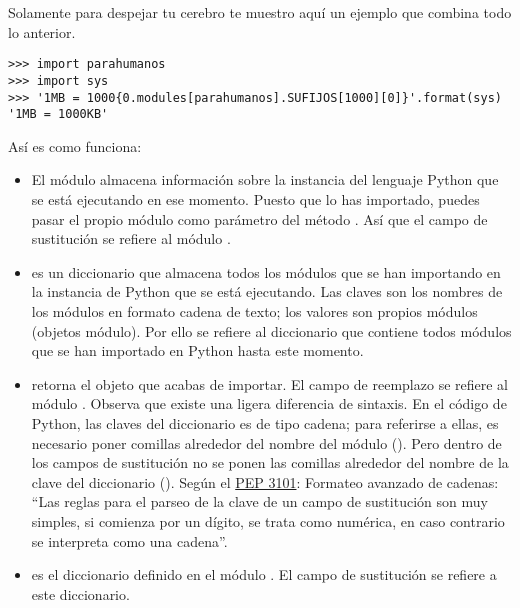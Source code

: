 Solamente para despejar tu cerebro te muestro aquí un ejemplo que combina todo lo anterior.

\noindent\begin{minipage}{\textwidth}
\begin{lstlisting}[mathescape=True]
>>> import parahumanos
>>> import sys
>>> '1MB = 1000{0.modules[parahumanos].SUFIJOS[1000][0]}'.format(sys)
'1MB = 1000KB'
\end{lstlisting}
\end{minipage}

Así es como funciona:

\begin{itemize}

\item El módulo  almacena información sobre la instancia del lenguaje Python que se está ejecutando en ese momento. Puesto que lo has importado, puedes pasar el propio módulo  como parámetro del método . Así que el campo de sustitución  se refiere al módulo .

\item {} es un diccionario que almacena todos los módulos que se han importando en la instancia de Python que se está ejecutando. Las claves son los nombres de los módulos en formato cadena de texto; los valores son propios módulos (objetos módulo). Por ello  se refiere al diccionario que contiene todos módulos que se han importado en Python hasta este momento.

\item {} retorna el objeto  que acabas de importar. El campo de reemplazo  se refiere al módulo . Observa que existe una ligera diferencia de sintaxis. En el código de Python, las claves del diccionario es de tipo cadena; para referirse a ellas, es necesario poner comillas alrededor del nombre del módulo (). Pero dentro de los campos de sustitución no se ponen las comillas alrededor del nombre de la clave del diccionario (). Según el \href{http://www.python.org/dev/peps/pep-3101/}{PEP 3101}: Formateo avanzado de cadenas: ``Las reglas para el parseo de la clave de un campo de sustitución son muy simples, si comienza por un dígito, se trata como numérica, en caso contrario se interpreta como una cadena''.

\item {} es el diccionario definido en el módulo . El campo de sustitución  se refiere a este diccionario.


\end{itemize}
